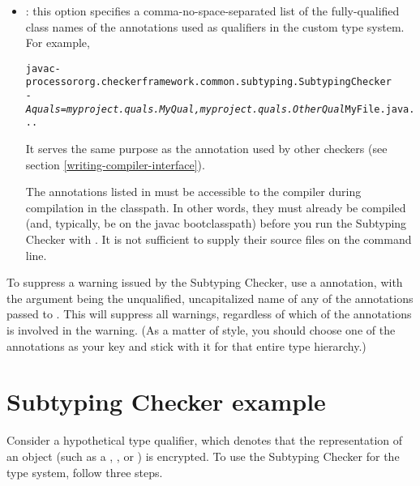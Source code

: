 \begin{itemize}

\item
{}: this option specifies a comma-no-space-separated list of
the fully-qualified class
names of the annotations used as qualifiers in the custom type system.  For
example,

\begin{alltt}
  javac -processor org.checkerframework.common.subtyping.SubtypingChecker
        \textit{-Aquals=myproject.quals.MyQual,myproject.quals.OtherQual} MyFile.java ...
\end{alltt}

It serves the same purpose as the 
annotation used by other checkers (see section
\ref{writing-compiler-interface}).

The annotations listed in  must be accessible to
the compiler during compilation in the classpath.  In other words, they must
already be compiled (and, typically, be on the javac bootclasspath)
before you run the Subtyping Checker with .  It
is not sufficient to supply their source files on the command line.

\end{itemize}

To suppress a warning issued by the Subtyping Checker, use a 
annotation, with the argument being the unqualified, uncapitalized name of
any of the annotations passed to .  This will suppress all
warnings, regardless of which of the annotations is involved in the
warning.  (As a matter of style, you should choose one of the annotations
as your  key and stick with it for that entire type
hierarchy.)


\section{Subtyping Checker example\label{subtyping-example}\label{encrypted-example}}

Consider a hypothetical  type qualifier, which denotes that the
representation of an object (such as a , , or
) is encrypted. To use the Subtyping Checker for the 
type system, follow three steps.

